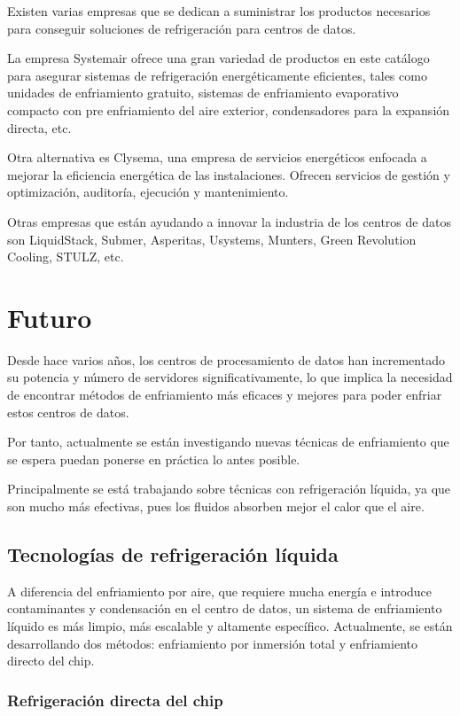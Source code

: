 Existen varias empresas que se dedican a suministrar los productos necesarios para conseguir soluciones de refrigeración para centros de datos.

La empresa Systemair ofrece una gran variedad de productos en este catálogo para asegurar sistemas de refrigeración energéticamente eficientes, tales como unidades de enfriamiento gratuito, sistemas de enfriamiento evaporativo compacto con pre enfriamiento del aire exterior, condensadores para la expansión directa, etc.

Otra alternativa es Clysema, una empresa de servicios energéticos enfocada a mejorar la eficiencia energética de las instalaciones. Ofrecen servicios de gestión y optimización, auditoría, ejecución y mantenimiento.

Otras empresas que están ayudando a innovar la industria de los centros de datos son LiquidStack, Submer, Asperitas, Usystems, Munters, Green Revolution Cooling, STULZ, etc.


\section*{Futuro}

Desde hace varios años, los centros de procesamiento de datos han incrementado su potencia y número de servidores significativamente, lo que implica la necesidad de encontrar métodos de enfriamiento más eficaces y mejores para poder enfriar estos centros de datos.

Por tanto, actualmente se están investigando nuevas técnicas de enfriamiento que se espera puedan ponerse en práctica lo antes posible.

Principalmente se está trabajando sobre técnicas con refrigeración líquida, ya que son mucho más efectivas, pues los fluidos absorben mejor el calor que el aire.

\subsection*{Tecnologías de refrigeración líquida}

A diferencia del enfriamiento por aire, que requiere mucha energía e introduce contaminantes y condensación en el centro de datos, un sistema de enfriamiento líquido es más limpio, más escalable y altamente específico. Actualmente, se están desarrollando dos métodos: enfriamiento por inmersión total y enfriamiento directo del chip.

\subsubsection*{Refrigeración directa del chip}

